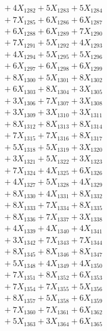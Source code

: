 \documentclass[a4paper,10pt]{article}
\begin{document}
{\begin{align}
&\;  + 4 X_{1282} + 5 X_{1283} + 5 X_{1284} \\[0.3ex]
&\;  + 7 X_{1285} + 6 X_{1286} + 6 X_{1287} \\[0.3ex]
&\;  + 6 X_{1288} + 6 X_{1289} + 7 X_{1290} \\[0.3ex]
&\;  + 7 X_{1291} + 5 X_{1292} + 4 X_{1293} \\[0.3ex]
&\;  + 4 X_{1294} + 5 X_{1295} + 5 X_{1296} \\[0.3ex]
&\;  + 6 X_{1297} + 6 X_{1298} + 6 X_{1299} \\[0.5ex]\allowbreak
&\;  + 8 X_{1300} + 5 X_{1301} + 8 X_{1302} \\[0.3ex]
&\;  + 6 X_{1303} + 8 X_{1304} + 3 X_{1305} \\[0.3ex]
&\;  + 3 X_{1306} + 7 X_{1307} + 3 X_{1308} \\[0.3ex]
&\;  + 3 X_{1309} + 3 X_{1310} + 3 X_{1311} \\[0.3ex]
&\;  + 8 X_{1312} + 8 X_{1313} + 8 X_{1314} \\[0.3ex]
&\;  + 7 X_{1315} + 7 X_{1316} + 8 X_{1317} \\[0.3ex]
&\;  + 5 X_{1318} + 5 X_{1319} + 3 X_{1320} \\[0.3ex]
&\;  + 3 X_{1321} + 5 X_{1322} + 3 X_{1323} \\[0.3ex]
&\;  + 7 X_{1324} + 4 X_{1325} + 6 X_{1326} \\[0.3ex]
&\;  + 4 X_{1327} + 5 X_{1328} + 4 X_{1329} \\[0.5ex]\allowbreak
&\;  + 8 X_{1330} + 4 X_{1331} + 8 X_{1332} \\[0.3ex]
&\;  + 8 X_{1333} + 7 X_{1334} + 8 X_{1335} \\[0.3ex]
&\;  + 8 X_{1336} + 7 X_{1337} + 3 X_{1338} \\[0.3ex]
&\;  + 4 X_{1339} + 4 X_{1340} + 4 X_{1341} \\[0.3ex]
&\;  + 3 X_{1342} + 7 X_{1343} + 7 X_{1344} \\[0.3ex]
&\;  + 8 X_{1345} + 8 X_{1346} + 8 X_{1347} \\[0.3ex]
&\;  + 5 X_{1348} + 4 X_{1349} + 4 X_{1350} \\[0.3ex]
&\;  + 7 X_{1351} + 8 X_{1352} + 6 X_{1353} \\[0.3ex]
&\;  + 7 X_{1354} + 7 X_{1355} + 5 X_{1356} \\[0.3ex]
&\;  + 8 X_{1357} + 5 X_{1358} + 6 X_{1359} \\[0.5ex]\allowbreak
&\;  + 7 X_{1360} + 7 X_{1361} + 6 X_{1362} \\[0.3ex]
&\;  + 5 X_{1363} + 3 X_{1364} + 6 X_{1365} \\[0.3ex]

\end{align}}
\end{document}
